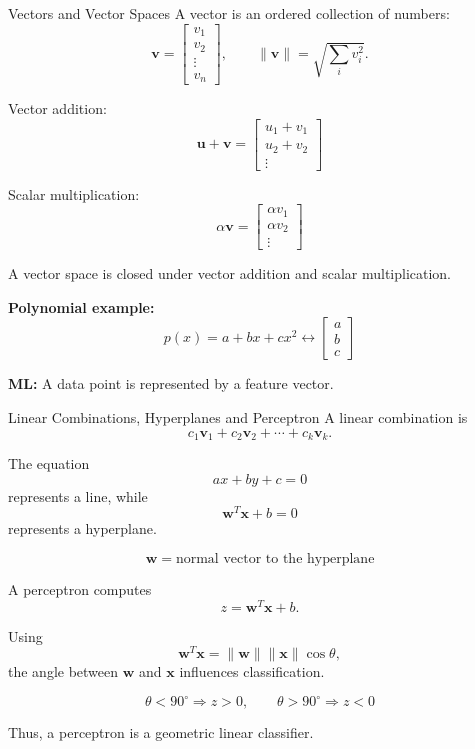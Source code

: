 \documentclass[aspectratio=169]{beamer}
\begin{document}
\begin{frame}{Vectors and Vector Spaces}
A vector is an ordered collection of numbers:
\[
\mathbf v=
\begin{bmatrix}
v_1\\v_2\\\vdots\\v_n
\end{bmatrix},
\qquad
\|\mathbf v\|=\sqrt{\sum_i v_i^2}.
\]

Vector addition:
\[
\mathbf u+\mathbf v
=
\begin{bmatrix}
u_1+v_1\\u_2+v_2\\\vdots
\end{bmatrix}
\]

Scalar multiplication:
\[
\alpha\mathbf v=
\begin{bmatrix}
\alpha v_1\\\alpha v_2\\\vdots
\end{bmatrix}
\]

A vector space is closed under vector addition and scalar multiplication.

\textbf{Polynomial example:}
\[
p(x)=a+bx+cx^2
\longleftrightarrow
\begin{bmatrix}a\\b\\c\end{bmatrix}
\]

\textbf{ML:} A data point is represented by a feature vector.
\end{frame}

\begin{frame}{Linear Combinations, Hyperplanes and Perceptron}
A linear combination is
\[
c_1\mathbf v_1+c_2\mathbf v_2+\cdots+c_k\mathbf v_k.
\]

The equation
\[
ax+by+c=0
\]
represents a line, while
\[
\mathbf w^T\mathbf x+b=0
\]
represents a hyperplane.

\[
\boxed{\mathbf w=\text{normal vector to the hyperplane}}
\]

A perceptron computes
\[
z=\mathbf w^T\mathbf x+b.
\]

Using
\[
\mathbf w^T\mathbf x
=
\|\mathbf w\|\|\mathbf x\|\cos\theta,
\]
the angle between $\mathbf w$ and $\mathbf x$ influences classification.

\[
\theta<90^\circ\Rightarrow z>0,\qquad
\theta>90^\circ\Rightarrow z<0
\]

Thus, a perceptron is a geometric linear classifier.
\end{frame}
\end{document}

